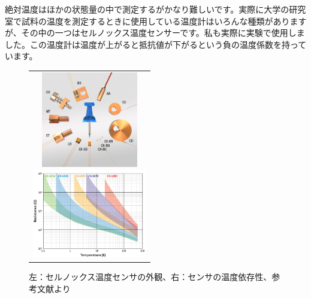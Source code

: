 \documentclass[10pt,b5paper,papersize,dvipdfmx]{jsbook}
\begin{document}
絶対温度はほかの状態量の中で測定するがかなり難しいです。実際に大学の研究室で試料の温度を測定するときに使用している温度計はいろんな種類がありますが、その中の一つはセルノックス温度センサーです。私も実際に実験で使用しました。この温度計は温度が上がると抵抗値が下がるという負の温度係数を持っています。
\begin{figure}[htbp]
  \begin{center}
      \begin{tabular}{c}
      \begin{minipage}{0.5\hsize}
          \begin{center}
          \includegraphics[clip, width=4.2cm]{img/cryotronics.png}
          \end{center}
      \end{minipage}
      \begin{minipage}{0.5\hsize}
          \begin{center}
          \includegraphics[clip, width=5cm]{img/CX-chart-1.png}
          \end{center}
      \end{minipage}
  
      \end{tabular}
      \caption{左：セルノックス温度センサの外観、右：センサの温度依存性、参考文献\cite{ondo}より}
      \label{fig:cryotronics}
  \end{center}
\end{figure}
\end{document}
